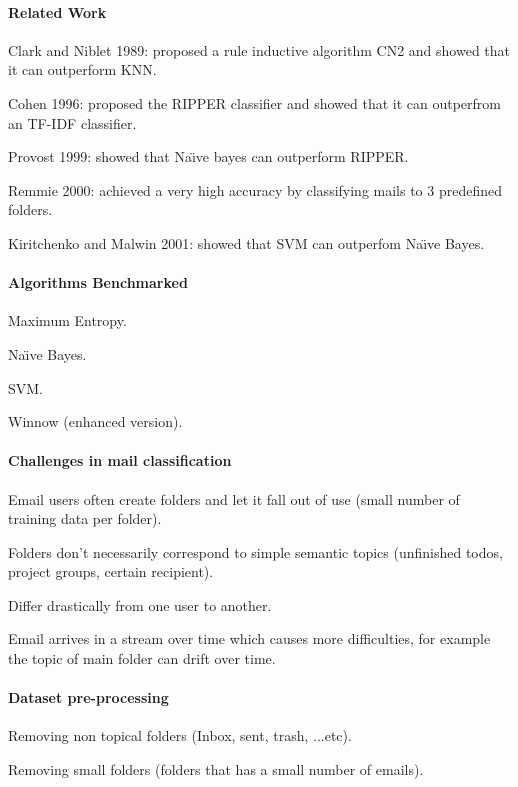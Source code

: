 \documentclass[12pt]{article}
\newenvironment{my_itemize}
{\begin{itemize}
  \setlength{\itemsep}{0cm}
  \setlength{\parskip}{0cm}}
{\end{itemize}}
\begin{document}
\paragraph{Related Work}
\begin{my_itemize}
  \item Clark and Niblet 1989: proposed a rule inductive algorithm CN2 and 
	showed that it can outperform KNN.
  \item Cohen 1996: proposed the RIPPER classifier and showed that it 
	can outperfrom an TF-IDF classifier.
  \item Provost 1999: showed that Na\"{\i}ve bayes can outperform RIPPER.
  \item Remmie 2000: achieved a very high accuracy by classifying mails to
	3 predefined folders.
  \item Kiritchenko and Malwin 2001: showed that SVM can outperfom Na\"{\i}ve Bayes.
\end{my_itemize}


\paragraph{Algorithms Benchmarked}
\begin{my_itemize}
  \item Maximum Entropy.
  \item Na\"{\i}ve Bayes.
  \item SVM.
  \item Winnow (enhanced version).
\end{my_itemize}

\paragraph{Challenges in mail classification}
\begin{my_itemize}
  \item Email users often create folders and let it fall out of use 
	(small number of training data per folder).
  \item Folders don't necessarily correspond to simple semantic topics 
	(unfinished todos, project groups, certain recipient).
  \item Differ drastically from one user to another.
  \item Email arrives in a stream over time which causes more difficulties, 
	for example the topic of main folder can drift over time.
\end{my_itemize}


\paragraph{Dataset pre-processing}
\begin{my_itemize}
    \item Removing non topical folders (Inbox, sent, trash, ...etc).
    \item Removing small folders (folders that has a small number of emails).
\end{my_itemize}
\end{document}

